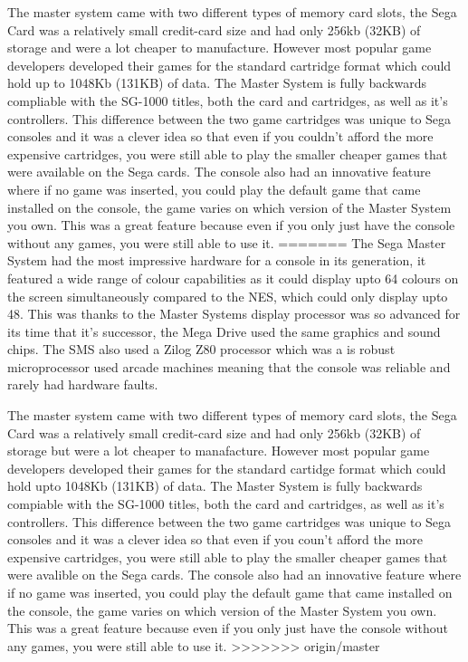 \documentclass{scrartcl}
\begin{document}
The master system came with two different types of memory card slots, the Sega Card was a relatively small credit-card size and had only 256kb (32KB) of storage and were a lot cheaper to manufacture. However most popular game developers developed their games for the standard cartridge format which could hold up to 1048Kb (131KB) of data. \cite{Weiss2009} The Master System is fully backwards compliable with the SG-1000 titles, both the card and cartridges, as well as it's controllers. \cite{racket} This difference between the two game cartridges was unique to Sega consoles and it was a clever idea so that even if you couldn't afford the more expensive cartridges, you were still able to play the smaller cheaper games that were available on the Sega cards. The console also had an innovative feature where if no game was inserted, you could play the default game that came installed on the console, the game varies on which version of the Master System you own. This was a great feature because even if you only just have the console without any games, you were still able to use it.
=======
The Sega Master System had the most impressive hardware for a console in its generation, it featured a wide range of colour capabilities as it could display upto 64 colours on the screen simultaneously compared to the NES\cite{racket}, which could only display upto 48. This was thanks to the Master Systems display processor was so advanced for its time that it's successor, the Mega Drive used the same graphics and sound chips. The SMS also used a Zilog Z80 processor which was a is robust microprocessor used arcade machines meaning that the console was reliable and rarely had hardware faults.\cite{russell} 

The master system came with two different types of memory card slots, the Sega Card was a relatively small credit-card size and had only 256kb (32KB) of storage but were a lot cheaper to manafacture. However most popular game developers developed their games for the standard cartidge format which could hold upto 1048Kb (131KB) of data. \cite{Weiss2009} The Master System is fully backwards compiable with the SG-1000 titles, both the card and cartridges, as well as it's controllers. \cite{racket} This difference between the two game cartridges was unique to Sega consoles and it was a clever idea so that even if you coun't afford the more expensive cartridges, you were still able to play the smaller cheaper games that were avalible on the Sega cards. The console also had an innovative feature where if no game was inserted, you could play the default game that came installed on the console, the game varies on which version of the Master System you own. This was a great feature because even if you only just have the console without any games, you were still able to use it.
>>>>>>> origin/master
\end{document}
